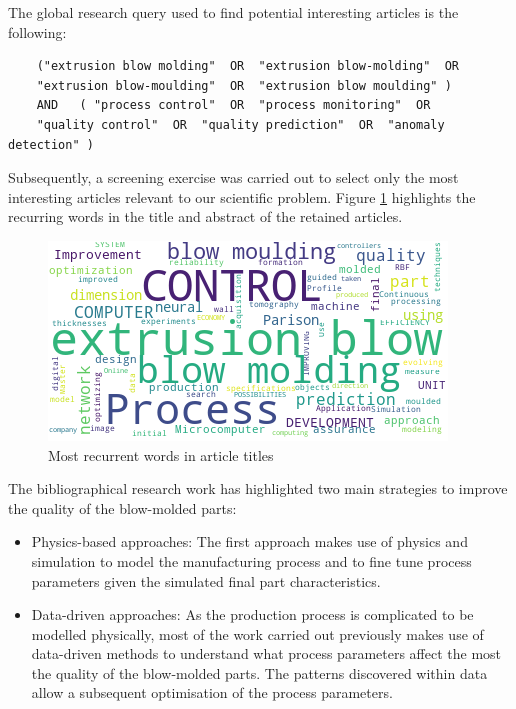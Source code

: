 The global research query used to find potential interesting articles is the following:

\begin{verbatim}
    ("extrusion blow molding"  OR  "extrusion blow-molding"  OR
    "extrusion blow-moulding"  OR  "extrusion blow moulding" )  
    AND   ( "process control"  OR  "process monitoring"  OR
    "quality control"  OR  "quality prediction"  OR  "anomaly detection" )
\end{verbatim}

Subsequently, a screening exercise was carried out to select only the most interesting articles relevant to our scientific problem. Figure \ref{fig:wordcloud} highlights the recurring words in the title and abstract of the retained articles. 

\begin{figure}
\centerline{\includegraphics[scale=1]{images/chapter_2/wordcloud.png}}
\caption{Most recurrent words in article titles}
\label{fig:wordcloud}
\end{figure}

The bibliographical research work has highlighted two main strategies to improve the quality of the blow-molded parts:

\begin{itemize}
    \item Physics-based approaches: The first approach makes use of physics and simulation to model the manufacturing process and to fine tune process parameters given the simulated final part characteristics. 
    \item Data-driven approaches: As the production process is complicated to be modelled physically, most of the work carried out previously makes use of data-driven methods to understand what process parameters affect the most the quality of the blow-molded parts. The patterns discovered within data allow a subsequent optimisation of the process parameters.
\end{itemize}


